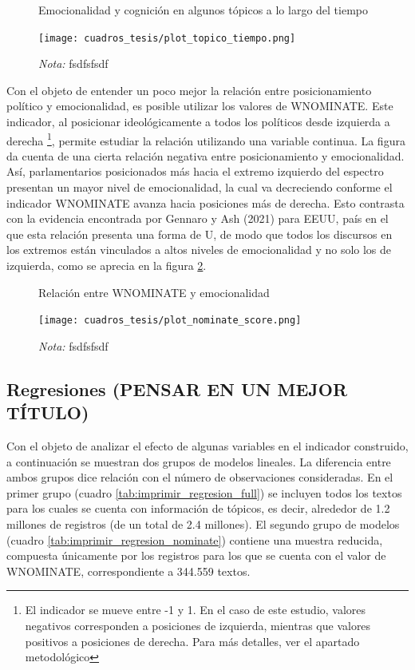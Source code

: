 \documentclass[
  12pt,
]{article}
\begin{document}
\begin{figure}[H]
\centering
\large
\caption{Emocionalidad y cognición en algunos tópicos a lo largo del tiempo}
\label{plot_topico_tiempo}
\texttt{[image: cuadros\_tesis/plot\_topico\_tiempo.png]}
     \caption*{\footnotesize{\textit{Nota:} fsdfsfsdf }}
\normalsize
\end{figure}

Con el objeto de entender un poco mejor la relación entre
posicionamiento político y emocionalidad, es posible utilizar los
valores de WNOMINATE. Este indicador, al posicionar ideológicamente a
todos los políticos desde izquierda a derecha
\footnote{El indicador se mueve entre -1 y 1. En el caso de este estudio, valores negativos corresponden a posiciones de izquierda, mientras que valores positivos a posiciones de derecha. Para más detalles, ver el apartado metodológico},
permite estudiar la relación utilizando una variable continua. La figura
da cuenta de una cierta relación negativa entre posicionamiento y
emocionalidad. Así, parlamentarios posicionados más hacia el extremo
izquierdo del espectro presentan un mayor nivel de emocionalidad, la
cual va decreciendo conforme el indicador WNOMINATE avanza hacia
posiciones más de derecha. Esto contrasta con la evidencia encontrada
por Gennaro y Ash (2021) para EEUU, país en el que esta relación
presenta una forma de U, de modo que todos los discursos en los extremos
están vinculados a altos niveles de emocionalidad y no solo los de
izquierda, como se aprecia en la figura \ref{plot_nominate_score}.

\begin{figure}[H]
\centering
\large
\caption{Relación entre WNOMINATE y emocionalidad}
\label{plot_nominate_score}
\texttt{[image: cuadros\_tesis/plot\_nominate\_score.png]}
     \caption*{\footnotesize{\textit{Nota:} fsdfsfsdf }}
\normalsize
\end{figure}

\hypertarget{regresiones-pensar-en-un-mejor-tuxedtulo}{%
\subsection{Regresiones (PENSAR EN UN MEJOR
TÍTULO)}\label{regresiones-pensar-en-un-mejor-tuxedtulo}}

Con el objeto de analizar el efecto de algunas variables en el indicador
construido, a continuación se muestran dos grupos de modelos lineales.
La diferencia entre ambos grupos dice relación con el número de
observaciones consideradas. En el primer grupo (cuadro
\ref{tab:imprimir_regresion_full}) se incluyen todos los textos para los
cuales se cuenta con información de tópicos, es decir, alrededor de 1.2
millones de registros (de un total de 2.4 millones). El segundo grupo de
modelos (cuadro \ref{tab:imprimir_regresion_nominate}) contiene una
muestra reducida, compuesta únicamente por los registros para los que se
cuenta con el valor de WNOMINATE, correspondiente a 344.559 textos.
\end{document}
